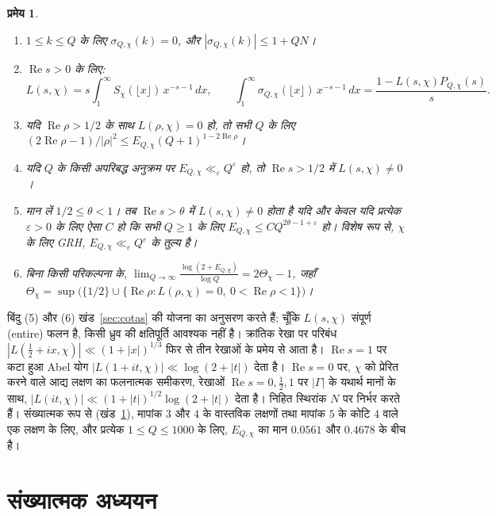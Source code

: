 \documentclass[11pt,a4paper]{amsart}
\newtheorem{teorema}{प्रमेय}
\theoremstyle{definition}
\theoremstyle{remark}
\renewcommand{\Re}{\operatorname{Re}}
\begin{document}
\begin{teorema}\label{teo:dirichlet}
\begin{enumerate}
\item $1\le k\le Q$ के लिए $\sigma_{Q,\chi}(k)=0$, और $|\sigma_{Q,\chi}(k)|\le1+QN$।
\item $\Re s>0$ के लिए:
\[
L(s,\chi)=s\int_1^\infty S_\chi(\lfloor x\rfloor)\,x^{-s-1}\,dx,\qquad
\int_1^\infty\sigma_{Q,\chi}(\lfloor x\rfloor)\,x^{-s-1}\,dx=\frac{1-L(s,\chi)P_{Q,\chi}(s)}{s}.
\]
\item यदि $\Re\rho>1/2$ के साथ $L(\rho,\chi)=0$ हो, तो सभी $Q$ के लिए $(2\Re\rho-1)/|\rho|^2\le E_{Q,\chi}(Q+1)^{1-2\Re\rho}$।
\item यदि $Q$ के किसी अपरिबद्ध अनुक्रम पर $E_{Q,\chi}\ll_\varepsilon Q^\varepsilon$ हो, तो $\Re s>1/2$ में $L(s,\chi)\ne0$।
\item मान लें $1/2\le\theta<1$। तब $\Re s>\theta$ में $L(s,\chi)\ne0$ होता है यदि और केवल यदि प्रत्येक $\varepsilon>0$ के लिए ऐसा $C$ हो कि सभी $Q\ge1$ के लिए $E_{Q,\chi}\le CQ^{2\theta-1+\varepsilon}$ हो। विशेष रूप से, $\chi$ के लिए GRH, $E_{Q,\chi}\ll_\varepsilon Q^\varepsilon$ के तुल्य है।
\item बिना किसी परिकल्पना के, $\displaystyle\lim_{Q\to\infty}\frac{\log(2+E_{Q,\chi})}{\log Q}=2\Theta_\chi-1$, जहाँ $\Theta_\chi=\sup\bigl(\{1/2\}\cup\{\Re\rho:L(\rho,\chi)=0,\ 0<\Re\rho<1\}\bigr)$।
\end{enumerate}
\end{teorema}

बिंदु (5) और (6) खंड~\ref{sec:cotas} की योजना का अनुसरण करते हैं; चूँकि $L(s,\chi)$ संपूर्ण (entire) फलन है, किसी ध्रुव की क्षतिपूर्ति आवश्यक नहीं है। क्रांतिक रेखा पर परिबंध $|L(\tfrac12+ix,\chi)|\ll(1+|x|)^{1/3}$ फिर से तीन रेखाओं के प्रमेय से आता है। $\Re s=1$ पर कटा हुआ Abel योग $|L(1+it,\chi)|\ll\log(2+|t|)$ देता है। $\Re s=0$ पर, $\chi$ को प्रेरित करने वाले आद्य लक्षण का फलनात्मक समीकरण, रेखाओं $\Re s=0,\tfrac12,1$ पर $|\Gamma|$ के यथार्थ मानों के साथ, $|L(it,\chi)|\ll(1+|t|)^{1/2}\log(2+|t|)$ देता है। निहित स्थिरांक $N$ पर निर्भर करते हैं। संख्यात्मक रूप से (खंड~\ref{sec:numerica}), मापांक $3$ और $4$ के वास्तविक लक्षणों तथा मापांक $5$ के कोटि $4$ वाले एक लक्षण के लिए, और प्रत्येक $1\le Q\le1000$ के लिए, $E_{Q,\chi}$ का मान $0.0561$ और $0.4678$ के बीच है।

\section{संख्यात्मक अध्ययन}\label{sec:numerica}
\end{document}
